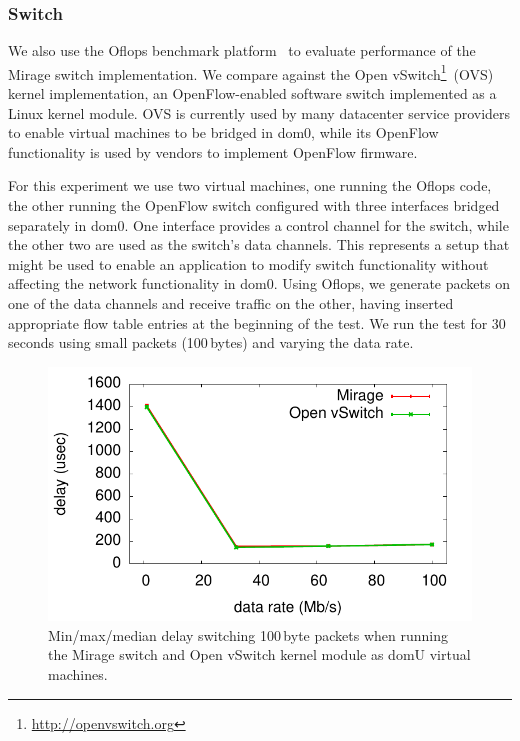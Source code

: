 \subsubsection{Switch}

We also use the Oflops benchmark platform~\cite{oflops} to evaluate
performance of the Mirage switch implementation. We compare against the Open
vSwitch\footnote{\url{http://openvswitch.org}}~(OVS) kernel implementation, an
OpenFlow-enabled software switch implemented as a Linux kernel module. OVS is
currently used by many datacenter service providers to enable virtual machines
to be bridged in dom0, while its OpenFlow functionality is used by vendors to
implement OpenFlow firmware.

For this experiment we use two virtual machines, one running the Oflops code,
the other running the OpenFlow switch configured with three interfaces bridged
separately in dom0. One interface provides a control channel for the switch,
while the other two are used as the switch's data channels. This represents a
setup that might be used to enable an application to modify switch
functionality without affecting the network functionality in dom0. Using
Oflops, we generate packets on one of the data channels and receive traffic on
the other, having inserted appropriate flow table entries at the beginning of
the test. We run the test for 30\,seconds using small packets (100\,bytes) and
varying the data rate.

\begin{figure}
\centering
\includegraphics[width=\columnwidth]{switch-media-delay}
\caption{\label{fig:switch}Min/max/median delay switching 100\,byte packets
        when running the Mirage switch and Open vSwitch kernel module as domU
        virtual machines.}
\vspace{-2ex}
\end{figure}

